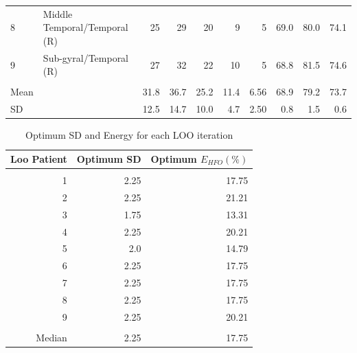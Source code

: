 \begin{table}[!h]
\begin{tabular}{llrrrrrrrr}
8       & Middle Temporal/Temporal (R)  & 25                        & 29                      & 20            & 9             & 5             & 69.0            & 80.0               & 74.1             \\
9       & Sub-gyral/Temporal (R)         & 27                        & 32                      & 22            & 10            & 5             & 68.8            & 81.5               & 74.6             \\
       &         &       &      &   &    &  &       &   &     \\
Mean   &                                  & 31.8             & 36.7           & 25.2 & 11.4 & 6.56 & 68.9   & 79.2      & 73.7    \\
SD      &                                  & 12.5             & 14.7           & 10.0 & 4.7  & 2.50 & 0.8    & 1.5       & 0.6    
\end{tabular}
\end{table}


\begin{table}[]
\centering
\caption{Optimum SD and Energy for each LOO iteration}
\small
\vspace{3mm}
\label{tbl:3-3}
\begin{tabular}{rrr}
Loo Patient & Optimum SD & Optimum $E_{HFO}(\%)$ \\
\hline
			&					  &									 \\
1           & 2.25                & 17.75                            \\
2           & 2.25                & 21.21                            \\
3           & 1.75                & 13.31                            \\
4           & 2.25                & 20.21                            \\
5           & 2.0                 & 14.79                            \\
6           & 2.25                & 17.75                            \\
7           & 2.25                & 17.75                            \\
8           & 2.25                & 17.75                            \\
9           & 2.25                & 20.21                            \\
			&					  &									 \\
Median      & 2.25                & 17.75                           
\end{tabular}
\end{table}


